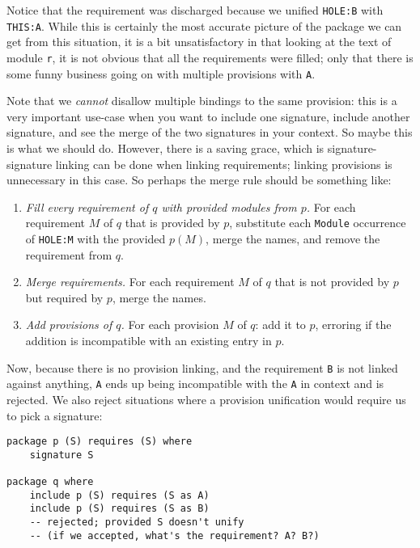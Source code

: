 \documentclass{article}
\newcommand{\Red}[1]{{\color{red} #1}}
\begin{document}
Notice that the requirement was discharged because we unified \verb|HOLE:B|
with \verb|THIS:A|.  While this is certainly the most accurate picture
of the package we can get from this situation, it is a bit unsatisfactory
in that looking at the text of module \verb|r|, it is not obvious that
all the requirements were filled; only that there is some funny business
going on with multiple provisions with \verb|A|.

Note that we \emph{cannot} disallow multiple bindings to the same provision:
this is a very important use-case when you want to include one signature,
include another signature, and see the merge of the two signatures in your
context.  \Red{So maybe this is what we should do.}  However, there is
a saving grace, which is signature-signature linking can be done when
linking requirements; linking provisions is unnecessary in this case.
So perhaps the merge rule should be something like:

\begin{enumerate}
    \item \emph{Fill every requirement of $q$ with provided modules from
        $p$.} For each requirement $M$ of $q$ that is provided by $p$,
        substitute each \verb|Module| occurrence of \verb|HOLE:M| with the
        provided $p(M)$, merge the names, and remove the requirement from $q$.
    \item \emph{Merge requirements.}  For each requirement $M$ of $q$ that is not
        provided by $p$ but required by $p$, merge the names.
    \item \emph{Add provisions of $q$.} For each provision $M$ of $q$:
        add it to $p$, erroring if the addition is incompatible with an
        existing entry in $p$.
\end{enumerate}

Now, because there is no provision linking, and the requirement \verb|B| is
not linked against anything, \verb|A| ends up being incompatible with
the \verb|A| in context and is rejected.  We also reject situations where
a provision unification would require us to pick a signature:

\begin{verbatim}
package p (S) requires (S) where
    signature S

package q where
    include p (S) requires (S as A)
    include p (S) requires (S as B)
    -- rejected; provided S doesn't unify
    -- (if we accepted, what's the requirement? A? B?)
\end{verbatim}
\end{document}
